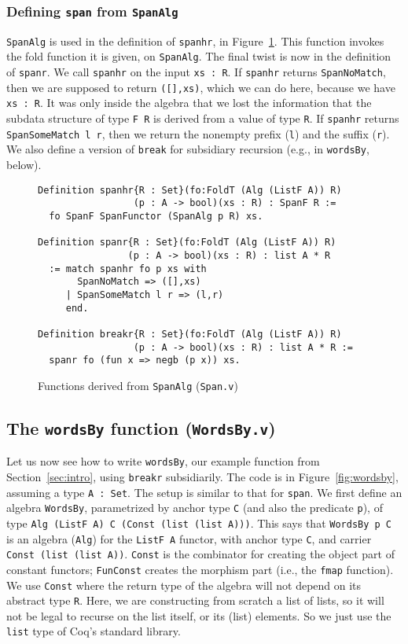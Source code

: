 \documentclass[a4paper,USenglish]{lipics-v2021}
\begin{document}
\subsubsection{Defining \texttt{span} from \texttt{SpanAlg}}

\verb|SpanAlg| is used in the definition of \verb|spanhr|, in
Figure~\ref{fig:span}.  This function invokes the fold function it is
given, on \verb|SpanAlg|.  The final twist is now in the definition of
\verb|spanr|.  We call \verb|spanhr| on the input \verb|xs : R|.  If
\verb|spanhr| returns \verb|SpanNoMatch|, then we are supposed to
return \verb|([],xs)|, which we can do here, because we have
\verb|xs : R|.  It was only inside the algebra that we lost the
information that the subdata structure of type \verb|F R| is derived
from a value of type \verb|R|.  If \verb|spanhr| returns
\verb|SpanSomeMatch l r|, then we return the nonempty
prefix (\verb|l|) and the suffix (\verb|r|).  We also define a version of \verb|break| for subsidiary recursion (e.g., in \verb|wordsBy|, below).


\begin{figure}
\begin{verbatim}
Definition spanhr{R : Set}(fo:FoldT (Alg (ListF A)) R)
                 (p : A -> bool)(xs : R) : SpanF R :=
  fo SpanF SpanFunctor (SpanAlg p R) xs.

Definition spanr{R : Set}(fo:FoldT (Alg (ListF A)) R)
                (p : A -> bool)(xs : R) : list A * R
  := match spanhr fo p xs with
       SpanNoMatch => ([],xs)
     | SpanSomeMatch l r => (l,r)
     end.

Definition breakr{R : Set}(fo:FoldT (Alg (ListF A)) R)
                 (p : A -> bool)(xs : R) : list A * R :=
  spanr fo (fun x => negb (p x)) xs.
\end{verbatim}
\caption{Functions derived from \texttt{SpanAlg} (\texttt{Span.v})}
\label{fig:span}
\end{figure}


\subsection{The \texttt{wordsBy} function (\texttt{WordsBy.v})}

Let us now see how to write \verb|wordsBy|, our example function from
Section~\ref{sec:intro}, using \verb|breakr| subsidiarily.
The code is in Figure~\ref{fig:wordsby}, assuming a type
\verb|A : Set|.  The setup is similar to that for \verb|span|.  We first define
an algebra \verb|WordsBy|, parametrized by anchor type \verb|C| (and also
the predicate \verb|p|), of type \verb|Alg (ListF A) C (Const (list (list A)))|.
 This says that \verb|WordsBy p C| is an algebra (\verb|Alg|)
for the \verb|ListF A| functor, with anchor type \verb|C|, and carrier
\verb|Const (list (list A))|.  \verb|Const| is the combinator for
creating the object part of constant functors; \verb|FunConst| creates
the morphism part (i.e., the \verb|fmap| function).  We use 
\verb|Const| where the return type of the
algebra will not depend on its abstract type \verb|R|.  Here, we are
constructing from scratch a list of lists, so it will not be legal to
recurse on the list itself, or its (list) elements.  So we just
use the \verb|list| type of Coq's standard library.
\end{document}
